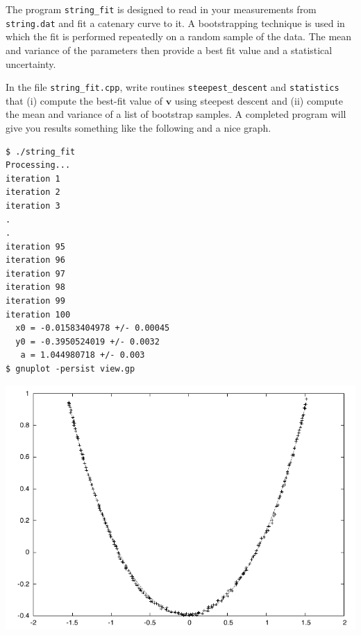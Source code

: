 \documentclass[11pt]{article}
\begin{document}
The program \verb!string_fit! is designed to read in your measurements from \verb!string.dat! and fit a catenary
curve to it. A bootstrapping technique is used in which the fit is performed repeatedly on a random sample
of the data. The mean and variance of the parameters then provide a best fit value and a statistical uncertainty.

In the file \verb!string_fit.cpp!, write routines \verb!steepest_descent!
and \verb!statistics! that (i) compute the best-fit value
of $\mathbf{v}$ using steepest descent and (ii) compute the mean and variance of a list of bootstrap samples.
A completed program will give you results something like the following and a nice graph.
{\small\begin{verbatim}
$ ./string_fit
Processing...
iteration 1
iteration 2
iteration 3
.
.
iteration 95
iteration 96
iteration 97
iteration 98
iteration 99
iteration 100
  x0 = -0.01583404978 +/- 0.00045
  y0 = -0.3950524019 +/- 0.0032
   a = 1.044980718 +/- 0.003
$ gnuplot -persist view.gp
\end{verbatim}}
\begin{center}
\includegraphics{catenary.pdf}
\end{center}
\end{document}
